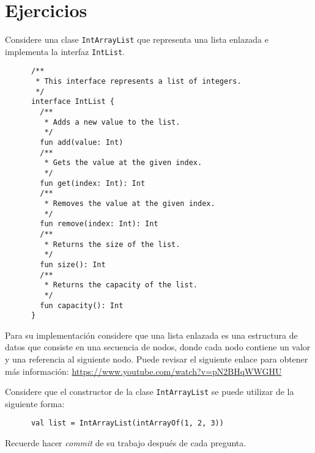 \section{Ejercicios}
\label{sec:tdd:ejercicios}
  \begin{Exercise}
    Considere una clase \texttt{IntArrayList} que representa una lista enlazada e implementa la
    interfaz \texttt{IntList}.
    \begin{verbatim}
      /**
       * This interface represents a list of integers.
       */
      interface IntList {
        /**
         * Adds a new value to the list.
         */
        fun add(value: Int)
        /**
         * Gets the value at the given index.
         */
        fun get(index: Int): Int
        /**
         * Removes the value at the given index.
         */
        fun remove(index: Int): Int
        /**
         * Returns the size of the list.
         */
        fun size(): Int
        /**
         * Returns the capacity of the list.
         */
        fun capacity(): Int
      }
    \end{verbatim}

    Para su implementación considere que una lista enlazada es una estructura de datos que consiste
    en una secuencia de nodos, donde cada nodo contiene un valor y una referencia al siguiente nodo.
    Puede revisar el siguiente enlace para obtener más información: 
    \url{https://www.youtube.com/watch?v=pN2BHqWWGHU}

    Considere que el constructor de la clase \texttt{IntArrayList} se puede utilizar de la siguiente
    forma: 
    \begin{verbatim}
      val list = IntArrayList(intArrayOf(1, 2, 3))
    \end{verbatim}

    Recuerde hacer \textit{commit} de su trabajo después de cada pregunta.


\end{Exercise}
